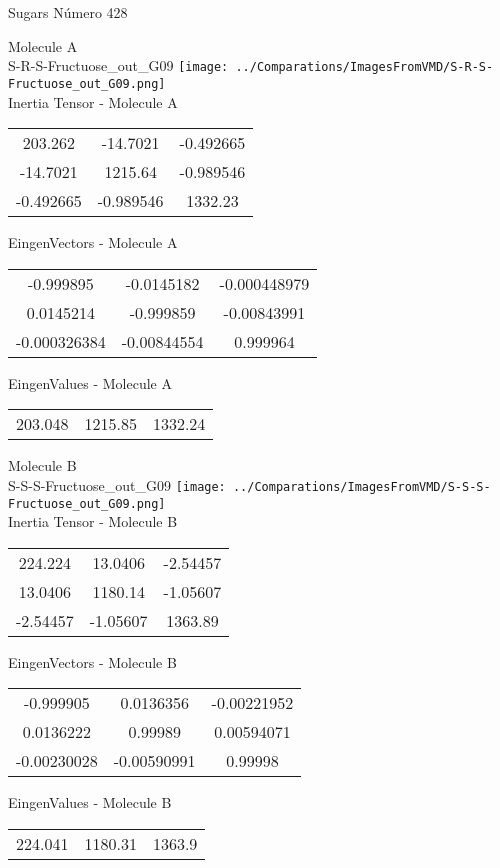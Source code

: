 \vtab[-2cm]
\begin{center}
{\large Sugars \tab Número 428}
\end{center}
\begin{multicols}{2}
\begin{center}

Molecule A \\ 
S-R-S-Fructuose\_out\_G09
\texttt{[image: ../Comparations/ImagesFromVMD/S-R-S-Fructuose\_out\_G09.png]}
\\
Inertia Tensor - Molecule A \\
\vtab

\begin{tabular}{|c c c|}
203.262	 & 	-14.7021	 & 	-0.492665	 \\
-14.7021	 & 	1215.64	 & 	-0.989546	 \\
-0.492665	 & 	-0.989546	 & 	1332.23
\end{tabular}

\vtab
 EingenVectors - Molecule A     \\
\vtab
\begin{tabular}{|c c c|}
-0.999895	 & 	-0.0145182	 & 	-0.000448979	 \\
0.0145214	 & 	-0.999859	 & 	-0.00843991	 \\
-0.000326384	 & 	-0.00844554	 & 	0.999964
\end{tabular}

\vtab
 EingenValues - Molecule A     \\
\vtab
\begin{tabular}{|c c c|}
203.048	 & 	1215.85	 & 	1332.24	 \\
\end{tabular}
\columnbreak

Molecule B \\ 
S-S-S-Fructuose\_out\_G09
\texttt{[image: ../Comparations/ImagesFromVMD/S-S-S-Fructuose\_out\_G09.png]}
\\
Inertia Tensor - Molecule B \\
\vtab

\begin{tabular}{|c c c|}
224.224	 & 	13.0406	 & 	-2.54457	 \\
13.0406	 & 	1180.14	 & 	-1.05607	 \\
-2.54457	 & 	-1.05607	 & 	1363.89
\end{tabular}

\vtab
 EingenVectors - Molecule B     \\
\vtab
\begin{tabular}{|c c c|}
-0.999905	 & 	0.0136356	 & 	-0.00221952	 \\
0.0136222	 & 	0.99989	 & 	0.00594071	 \\
-0.00230028	 & 	-0.00590991	 & 	0.99998
\end{tabular}

\vtab
 EingenValues - Molecule B     \\
\vtab
\begin{tabular}{|c c c|}
224.041	 & 	1180.31	 & 	1363.9	 \\
\end{tabular}

\end{center}
\end{multicols}
